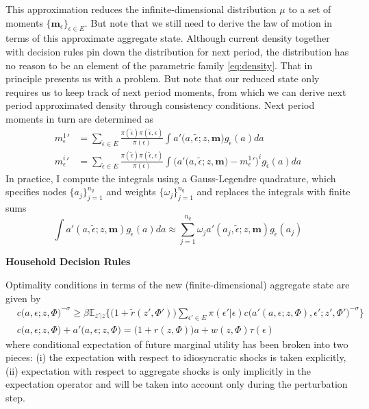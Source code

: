 \documentclass[a4paper,10pt]{article}  %
\begin{document}
This approximation reduces the infinite-dimensional distribution $\mu$ to a set of moments
$ \big\{\mathbf{m}_{\epsilon}\big\}_{\epsilon \in E} $. But note that we still need to derive the law of motion
in terms of this approximate aggregate state. Although current density together with decision rules pin down the
distribution for next period, the distribution has no reason to be an element of the parametric family
\eqref{eq:density}.
That in principle presents us with a problem. But note that our reduced state only requires us to keep track of
next period moments, from which we can derive next period approximated density through consistency conditions.
Next period moments in turn are determined as
%
\begin{align*}
   {m_{\epsilon}^1}' & = \sum_{ \tilde{\epsilon} \in E }
   \frac{ \pi ( \tilde{\epsilon} ) \pi( \tilde{\epsilon}, \epsilon ) }{ \pi( \epsilon ) }
   \int a'\Big( a, \tilde{\epsilon}; z, \mathbf{m} \Big) g_{ \tilde{\epsilon} }(a) da \\
   {m_{\epsilon}^i}' & =   \sum_{ \tilde{\epsilon} \in E }
   \frac{ \pi ( \tilde{\epsilon} ) \pi( \tilde{\epsilon}, \epsilon ) }{ \pi( \epsilon ) }
   \int \Big( a'\Big( a, \tilde{\epsilon}; z, \mathbf{m} \Big)  - {m_{\epsilon}^1}' \Big)^i g_{ \tilde{\epsilon} }(a) da
\end{align*}
%
In practice, I compute the integrals using a Gauss-Legendre quadrature, which specifies nodes
$\big\{ a_j \big\}_{j=1}^{n_q}$ and weights $\big\{ \omega_j \big\}_{j=1}^{n_q}$ and replaces the integrals
with finite sums
\begin{equation*}
   \label{eq:aaa}
   \int a'( a, \tilde{\epsilon}; z, \mathbf{m} ) g_{ \tilde{\epsilon} }(a) da \approx
   \sum_{j=1}^{n_q} \omega_j a'( a_j, \tilde{\epsilon}; z, \mathbf{m} ) g_{ \tilde{\epsilon} }(a_j)
\end{equation*}

\textbf{Household Decision Rules}

Optimality conditions in terms of the new (finite-dimensional) aggregate state are given by
\begin{align*}
     & c \Big( a, \epsilon; z, \Phi \Big)^{ - \sigma } \ge \beta \mathbb{E}_{z'|z}
   \Bigg\{
   \big( 1+\tilde{r}( z', \Phi')  \big)
   \sum_{ \epsilon' \in E } \pi( \epsilon'| \epsilon )  c \Big( a'( a, \epsilon; z, \Phi ), \epsilon'; z', \Phi' \Big)^{- \sigma}
   \Bigg\} \\
     & c\big( a, \epsilon; z, \Phi \big) + a'\big( a, \epsilon; z, \Phi \big) =
   \big( 1 + r( z, \Phi ) \big) a + w ( z,\Phi ) \tau( \epsilon )
\end{align*}
where conditional expectation of future marginal utility has been broken into two pieces: (i) the expectation
with respect to idiosyncratic shocks is taken explicitly, (ii) expectation with respect to aggregate shocks is only
implicitly in the expectation operator and will be taken into account only during the perturbation step.
\end{document}
